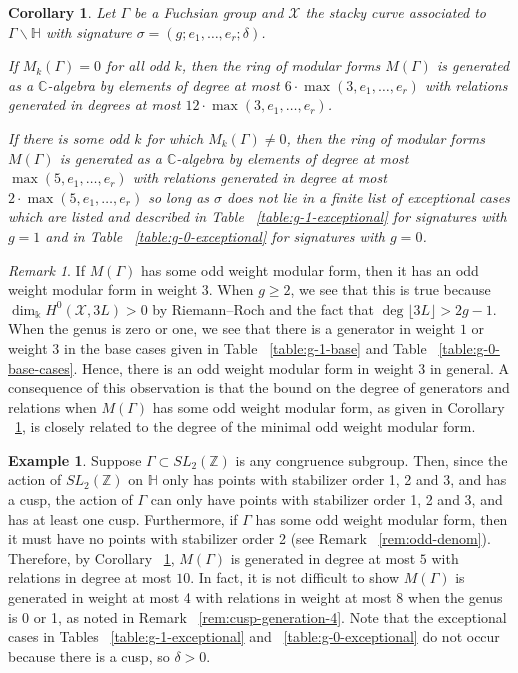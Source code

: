 \documentclass{amsart}
\theoremstyle{plain}
\newtheorem{cor}[thm]{Corollary}
\theoremstyle{definition}
\newtheorem{example}[thm]{Example}
\theoremstyle{remark}
\newtheorem{rem}[thm]{Remark}
\numberwithin{equation}{section}
\newcommand\BH{{\mathbb H}}
\newcommand\BC{{\mathbb C}}
\newcommand\BZ{{\mathbb Z}}
\newcommand\Bk{{\Bbbk}}
\newcommand\sx{\mathscr X}
\newcommand{\halfcan}{L}
\begin{document}
\begin{cor}
\label{cor:main-mod-forms}
Let $\Gamma$ be a Fuchsian group and $\sx$ the stacky curve
associated to $\Gamma \backslash \BH$ with signature $\sigma
= (g; e_1, \ldots, e_r; \delta)$. 

If $M_k(\Gamma) = 0$ for all odd $k$, then the ring of modular
forms $M(\Gamma)$ is generated as a $\BC$-algebra by elements of
degree at most $6 \cdot \max(3, e_1, \ldots, e_r)$ with relations
generated in degrees at most $12 \cdot \max(3, e_1, \ldots, e_r)$.

If there is some odd $k$ for which $M_k(\Gamma) \neq 0$, then the
ring of modular forms $M(\Gamma)$ is generated as a $\BC$-algebra
by elements of degree at most $\max(5, e_1, \ldots, e_r)$ with
relations generated in degree at most $2 \cdot \max(5, e_1, \ldots, 
e_r)$ so long as $\sigma$ does not lie in a finite list of
exceptional cases which are listed and described in Table
~\ref{table:g-1-exceptional} for signatures with $g = 1$ and in
Table ~\ref{table:g-0-exceptional} for signatures with $g = 0$.
\end{cor}

\begin{rem}
\label{rem:gen-at-most-three}
If $M(\Gamma)$ has some odd weight modular form, then it has an odd weight modular form in weight $3$. When $g \geq 2$, we see that this is true because $\dim_\Bk H^0(\sx, 3\halfcan) > 0$ by Riemann--Roch and the fact that $\deg \lfloor 3\halfcan \rfloor > 2g - 1$. When the genus is zero or one, we see that there is a generator in weight $1$ or weight $3$ in the base cases given in Table ~\ref{table:g-1-base} and Table ~\ref{table:g-0-base-cases}. Hence, there is an odd weight modular form in weight $3$ in general. A consequence of this observation is that the bound on the degree of generators and relations when $M(\Gamma)$ has some odd weight modular form, as given in Corollary ~\ref{cor:main-mod-forms}, is closely related to the degree of the minimal odd weight modular form.
\end{rem}

\begin{example}
\label{eg:congruence-bounds}
Suppose $\Gamma \subset SL_2(\BZ)$ is any congruence subgroup. Then, since
the action  of $SL_2(\BZ)$ on $\BH$ only has points with stabilizer order 1, 2 and 3, and has a cusp, the 
action of $\Gamma$ can only have points with stabilizer order 1, 2 and 3, and has at least one cusp.
Furthermore, if $\Gamma$ has some odd weight modular form, then it must 
have no points with stabilizer order 2 (see Remark ~\ref{rem:odd-denom}). 
Therefore, by Corollary ~\ref{cor:main-mod-forms}, $M(\Gamma)$ is 
generated in degree at most $5$ with relations in degree at most $10$. In fact, it is not difficult to show $M(\Gamma)$ is generated in weight at most 4 with relations in weight at most 8 when the genus is 0 or 1, as noted in Remark ~\ref{rem:cusp-generation-4}. Note that the exceptional cases in Tables ~\ref{table:g-1-exceptional} and ~\ref{table:g-0-exceptional} do not occur because there is a cusp, so $\delta > 0$.
\end{example}
\end{document}
